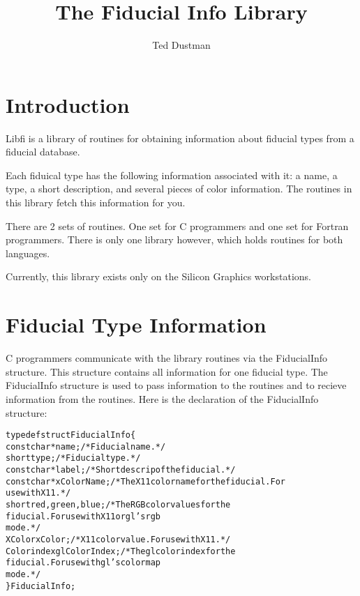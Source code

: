 \documentclass[letterpaper,11pt]{article}
\newcommand{\btt}{\begin{alltt}}        % Begin `typed' text.
\newcommand{\ett}{\end{alltt}}                  %
\newcommand{\itt}[1]{{\ttfamily #1}}
\begin{document}
\title{The Fiducial Info Library}
\author{Ted Dustman}
\maketitle
{}
\tableofcontents 
\pagebreak
{}

\section{Introduction}

Libfi is a library of routines for obtaining information about fiducial
types from a fiducial database.

Each fiduical type has the following information associated with it: a
name, a type, a short description, and several pieces of color information.
The routines in this library fetch this information for you.

There are 2 sets of routines.  One set for C programmers and one set for
Fortran programmers.  There is only one library however, which holds
routines for both languages.

Currently, this library exists only on the Silicon Graphics workstations.

\section{Fiducial Type Information}

C programmers communicate with the library routines via the 
\itt{FiducialInfo} structure.  This structure contains all information for
one fiducial type.  The \itt{FiducialInfo} structure is used to pass information to
the routines and to recieve information from the routines.  Here is the
declaration of the \itt{FiducialInfo} structure:

\btt
typedef struct FiducialInfo \{
    const char *name;       /* Fiducial name. */
    short type;             /* Fiducial type. */
    const char *label;      /* Short descrip of the fiducial. */
    const char *xColorName; /* The X11 color name for the fiducial. For
                               use with X11. */
    short red, green, blue; /* The RGB color values for the
                               fiducial. For use with X11 or gl's rgb
                               mode. */
    XColor xColor;          /* X11 color value. For use with X11. */
    Colorindex glColorIndex;/* The gl color index for the
                               fiducial. For use with gl's colormap
                               mode. */
\} FiducialInfo;
\ett
\end{document}
